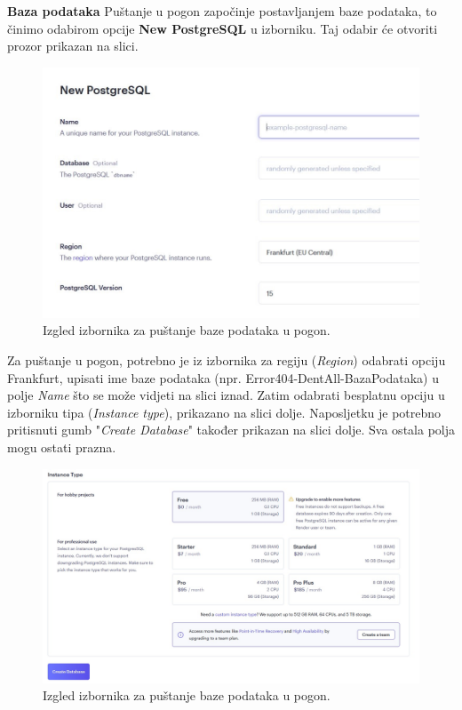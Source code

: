 			\textbf{Baza podataka} \newline
			Puštanje u pogon započinje postavljanjem baze podataka, to činimo odabirom opcije \textbf{New PostgreSQL} u izborniku. Taj odabir će otvoriti prozor prikazan na slici.
			\begin{figure}[H]
				\includegraphics[width=\linewidth]{slike/PostgreSQLprviDio.JPG}
				\centering
				\caption{Izgled izbornika za puštanje baze podataka u pogon.}
				\label{fig:PostgreSQL izbornik prvi dio}
			\end{figure}
			Za puštanje u pogon, potrebno je iz izbornika za regiju (\textit{Region}) odabrati opciju Frankfurt, upisati ime baze podataka (npr. Error404-DentAll-BazaPodataka) u polje \textit{Name} što se može vidjeti na slici iznad. Zatim odabrati besplatnu opciju u izborniku tipa (\textit{Instance type}), prikazano na slici dolje. Naposljetku je potrebno pritisnuti gumb "\textit{Create Database}" također prikazan na slici dolje. Sva ostala polja mogu ostati prazna.
			\begin{figure}[H]
				\includegraphics[width=\linewidth]{slike/PostgreSQLdrugiDio.JPG}
				\centering
				\caption{Izgled izbornika za puštanje baze podataka u pogon.}
				\label{fig:PostgreSQL izbornik drugi dio}
			\end{figure}
